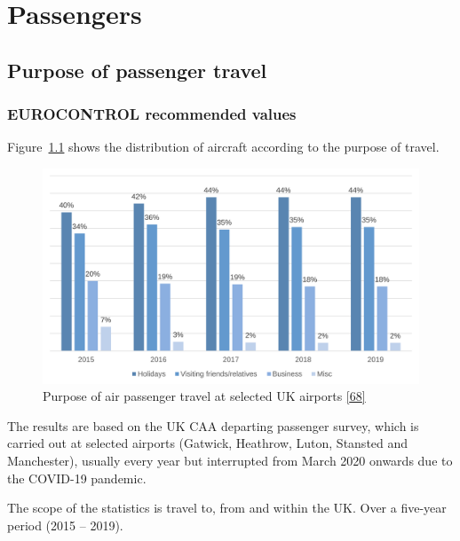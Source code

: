 \documentclass[
  11pt,
  a4paper,
]{book}
\begin{document}
\part{Passengers}

\hypertarget{sec-purpose-of-passenger-travel}{%
\chapter{Purpose of passenger
travel}\label{sec-purpose-of-passenger-travel}}

\hypertarget{eurocontrol-recommended-values-33}{%
\section{EUROCONTROL recommended
values}\label{eurocontrol-recommended-values-33}}

Figure~\ref{fig-travel-purpose} shows the distribution of aircraft
according to the purpose of travel.

\begin{figure}

{\centering \includegraphics{chapters/../figures/travel_purpose.svg}

}

\caption{\label{fig-travel-purpose}Purpose of air passenger travel at
selected UK airports
\protect\hyperlink{ref-AviationStatistics2022}{{[}68{]}}}

\end{figure}

The results are based on the UK CAA departing passenger survey, which is
carried out at selected airports (Gatwick, Heathrow, Luton, Stansted and
Manchester), usually every year but interrupted from March 2020 onwards
due to the COVID-19 pandemic.

The scope of the statistics is travel to, from and within the UK. Over a
five-year period (2015 -- 2019).
\end{document}
